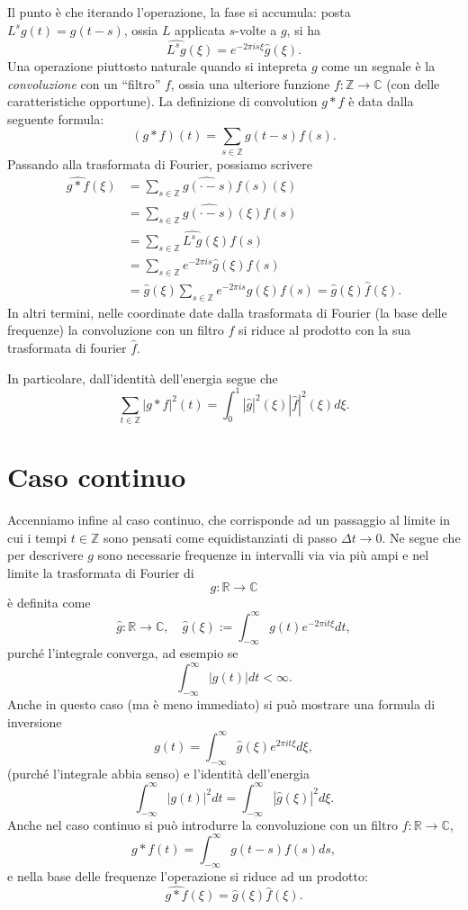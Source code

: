 \documentclass[
  italian,
  letterpaper,
]{book}
\newcommand{\R}{\mathbb{R}}
\theoremstyle{definition}
\theoremstyle{remark}
\begin{document}
Il punto è che iterando l'operazione, la fase si accumula: posta
\(L^s g(t) = g(t-s)\), ossia \(L\) applicata \(s\)-volte a \(g\), si ha
\[\widehat{ L^s g}(\xi) = e^{-2 \pi i s \xi } \hat{g}(\xi).\] Una
operazione piuttosto naturale quando si intepreta \(g\) come un segnale
è la \emph{convoluzione} con un ``filtro'' \(f\), ossia una ulteriore
funzione \(f: \mathbb{Z} \to \mathbb{C}\) (con delle caratteristiche
opportune). La definizione di convolution \(g*f\) è data dalla seguente
formula: \[ (g * f) (t ) =  \sum_{s  \in \mathbb{Z}} g(t-s) f(s).\]
Passando alla trasformata di Fourier, possiamo scrivere
\[ \begin{split} \widehat{g * f}(\xi) & = \widehat{ \sum_{s  \in \mathbb{Z}} g(\cdot-s) f(s)} (\xi) \\
& = \sum_{s  \in \mathbb{Z}}\widehat{ g(\cdot-s)} (\xi) f(s)\\
&  = \sum_{s  \in \mathbb{Z}} \widehat{ L^s g} (\xi) f(s)\\
& = \sum_{s  \in \mathbb{Z}} e^{-2\pi i s} \hat g (\xi) f(s)\\
& = \hat g (\xi) \sum_{s  \in \mathbb{Z}} e^{-2\pi i s} \hat g (\xi) f(s) = \hat{g}(\xi) \hat{f}(\xi).\end{split}\]
In altri termini, nelle coordinate date dalla trasformata di Fourier (la
base delle frequenze) la convoluzione con un filtro \(f\) si riduce al
prodotto con la sua trasformata di fourier \(\hat{f}\).

In particolare, dall'identità dell'energia segue che
\[ \sum_{ t \in \mathbb{Z}} |g * f|^2(t) = \int_0^1 |\hat{g}|^2(\xi)|\hat{f}|^2(\xi ) d \xi.\]

\section{Caso continuo}\label{sec-fourier-continua}

Accenniamo infine al caso continuo, che corrisponde ad un passaggio al
limite in cui i tempi \(t \in \mathbb{Z}\) sono pensati come
equidistanziati di passo \(\Delta t \to 0\). Ne segue che per descrivere
\(g\) sono necessarie frequenze in intervalli via via più ampi e nel
limite la trasformata di Fourier di \[g : \R \to \mathbb{C}\] è definita
come
\[ \hat{g}: \R \to \mathbb{C}, \quad \hat{g}(\xi) := \int_{-\infty}^\infty g(t) e^{-2\pi i t \xi} d t,\]
purché l'integrale converga, ad esempio se
\[ \int_{-\infty}^\infty |g(t)| d t < \infty.\] Anche in questo caso (ma
è meno immediato) si può mostrare una formula di inversione
\[ g(t) =  \int_{-\infty}^\infty \hat{g}(\xi) e^{2 \pi i t \xi}d \xi,\]
(purché l'integrale abbia senso) e l'identità dell'energia
\[ \int_{-\infty}^\infty |g(t)|^2 d t=  \int_{-\infty}^{\infty} |\hat{g}(\xi)|^2 d \xi.\]
Anche nel caso continuo si può introdurre la convoluzione con un filtro
\(f: \R \to \mathbb{C}\),
\[ g  * f(t) = \int_{-\infty}^\infty g(t-s)f(s) d s,\] e nella base
delle frequenze l'operazione si riduce ad un prodotto:
\[ \widehat{ g * f}(\xi) = \hat g (\xi) \hat f (\xi).\]
\end{document}
